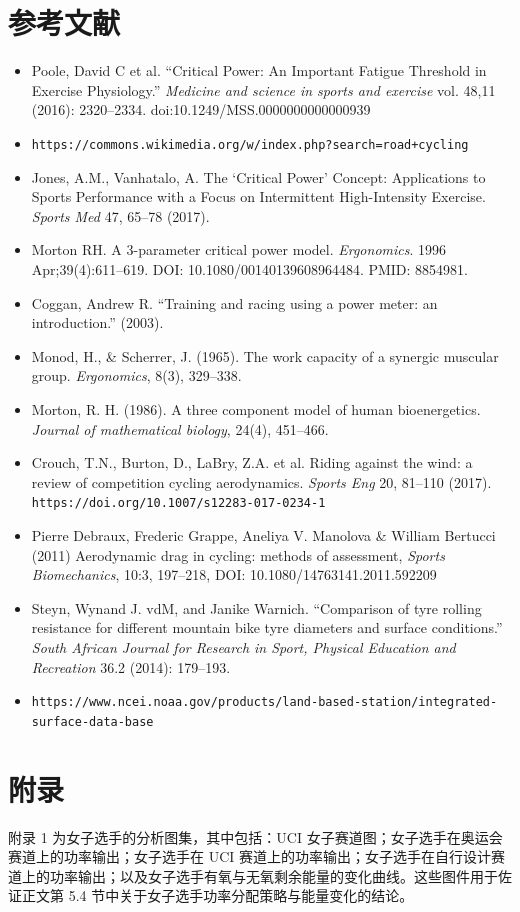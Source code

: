 \documentclass[11pt,a4paper]{ctexart}
\begin{document}
\section*{参考文献}

\begin{itemize}
\item[{[1]}] Poole, David C et al. ``Critical Power: An Important Fatigue Threshold in Exercise Physiology.'' \emph{Medicine and science in sports and exercise} vol. 48,11 (2016): 2320--2334. doi:10.1249/MSS.0000000000000939
\item[{[2]}] \texttt{https://commons.wikimedia.org/w/index.php?search=road+cycling}
\item[{[3]}] Jones, A.M., Vanhatalo, A. The `Critical Power' Concept: Applications to Sports Performance with a Focus on Intermittent High-Intensity Exercise. \emph{Sports Med} 47, 65--78 (2017).
\item[{[4]}] Morton RH. A 3-parameter critical power model. \emph{Ergonomics}. 1996 Apr;39(4):611--619. DOI: 10.1080/00140139608964484. PMID: 8854981.
\item[{[5]}] Coggan, Andrew R. ``Training and racing using a power meter: an introduction.'' (2003).
\item[{[6]}] Monod, H., \& Scherrer, J. (1965). The work capacity of a synergic muscular group. \emph{Ergonomics}, 8(3), 329--338.
\item[{[7]}] Morton, R. H. (1986). A three component model of human bioenergetics. \emph{Journal of mathematical biology}, 24(4), 451--466.
\item[{[8]}] Crouch, T.N., Burton, D., LaBry, Z.A. et al. Riding against the wind: a review of competition cycling aerodynamics. \emph{Sports Eng} 20, 81--110 (2017). \texttt{https://doi.org/10.1007/s12283-017-0234-1}
\item[{[9]}] Pierre Debraux, Frederic Grappe, Aneliya V. Manolova \& William Bertucci (2011) Aerodynamic drag in cycling: methods of assessment, \emph{Sports Biomechanics}, 10:3, 197--218, DOI: 10.1080/14763141.2011.592209
\item[{[10]}] Steyn, Wynand J. vdM, and Janike Warnich. ``Comparison of tyre rolling resistance for different mountain bike tyre diameters and surface conditions.'' \emph{South African Journal for Research in Sport, Physical Education and Recreation} 36.2 (2014): 179--193.
\item[{[11]}] \texttt{https://www.ncei.noaa.gov/products/land-based-station/integrated-surface-data-base}
\end{itemize}

\section*{附录}

附录 1 为女子选手的分析图集，其中包括：UCI 女子赛道图；女子选手在奥运会赛道上的功率输出；女子选手在 UCI 赛道上的功率输出；女子选手在自行设计赛道上的功率输出；以及女子选手有氧与无氧剩余能量的变化曲线。这些图件用于佐证正文第 5.4 节中关于女子选手功率分配策略与能量变化的结论。
\end{document}
